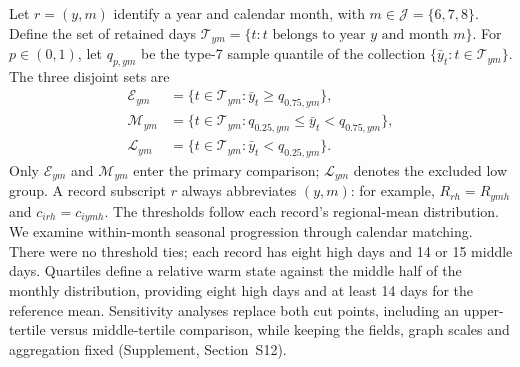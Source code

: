 \documentclass[namedate,webpdf,modern,mediumone]{oup-authoring-template}
\begin{document}
Let $r=(y,m)$ identify a year and calendar month, with
$m\in\mathcal J=\{6,7,8\}$. Define the set of retained days
$\mathcal T_{ym}=\{t:t\text{ belongs to year }y\text{ and month }m\}$.
For $p\in(0,1)$, let $q_{p,ym}$ be the type-7 sample quantile of the
collection $\{\bar y_t:t\in\mathcal T_{ym}\}$. The three disjoint sets are
\begin{equation}
\begin{split}
\mathcal E_{ym}&=\{t\in\mathcal T_{ym}:\bar y_t\ge q_{0.75,ym}\},\\
\mathcal M_{ym}&=\{t\in\mathcal T_{ym}:q_{0.25,ym}\le\bar y_t<q_{0.75,ym}\},\\
\mathcal L_{ym}&=\{t\in\mathcal T_{ym}:\bar y_t<q_{0.25,ym}\}.
\end{split}
\label{eq:event-sets}
\end{equation}
Only $\mathcal E_{ym}$ and $\mathcal M_{ym}$ enter the primary comparison;
$\mathcal L_{ym}$ denotes the excluded low group. A record subscript $r$
always abbreviates $(y,m)$: for example, $R_{rh}=R_{ymh}$ and
$c_{irh}=c_{iymh}$. The thresholds follow each record's regional-mean distribution.
We examine within-month seasonal progression through calendar matching. There were no threshold ties; each record has
eight high days and 14 or 15 middle days. Quartiles define a relative warm
state against the middle half of the monthly distribution, providing
eight high days and at least 14 days for the reference mean. Sensitivity
analyses replace both cut points,
including an upper-tertile versus middle-tertile comparison, while keeping
the fields, graph scales and aggregation fixed (Supplement,
Section~S12).
\end{document}
